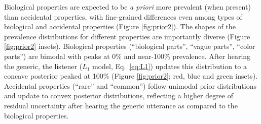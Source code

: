 \documentclass{pnastwo}
\begin{document}
\begin{article}
%


Biological properties are expected to be \emph{a priori} more prevalent (when present) than accidental properties, with fine-grained differences even among types of biological and accidental properties (Figure \ref{fig:prior2}).
The shapes of the prevalence distributions for different properties are importantly diverse (Figure \ref{fig:prior2} insets). 
Biological properties (``biological parts'', ``vague parts'', ``color parts'') are bimodal with peaks at 0\% and near-100\% prevalence. 
After hearing the generic, the listener ($L_1$ model, Eq.~\ref{eq:L1}) updates this distribution to a concave posterior  peaked at 100\% (Figure \ref{fig:prior2}; red, blue and green insets). 
Accidental properties (``rare'' and ``common'') follow unimodal prior distributions and update to convex posterior distributions, reflecting a higher degree of residual uncertainty after hearing the generic utterance as compared to the biological properties. 




\end{article}
\end{document}
